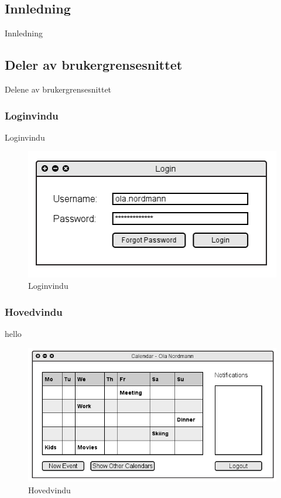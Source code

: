 \subsection{Innledning}
Innledning

\subsection{Deler av brukergrensesnittet}
Delene av brukergrensesnittet

\subsubsection{Loginvindu}
Loginvindu

\begin{figure}[H]
\centering
\includegraphics[scale=0.65]{images/login.png}
\caption{Loginvindu}
\label{login_image}
\end{figure}


\subsubsection{Hovedvindu}
hello

\begin{figure}[H]
\centering
\includegraphics[scale=0.65]{images/hovedvindu.png}
\caption{Hovedvindu}
\label{hovedvindu_image}
\end{figure}

